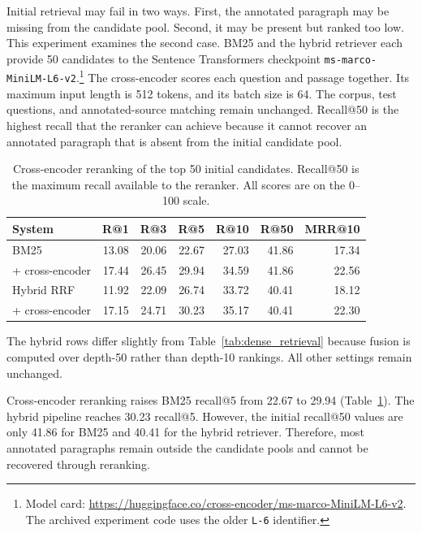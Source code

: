\documentclass[pdflatex,sn-basic]{sn-jnl}%
\theoremstyle{thmstyleone}%
\theoremstyle{thmstyletwo}%
\theoremstyle{thmstylethree}%
\begin{document}
Initial retrieval may fail in two ways. First, the annotated paragraph may be
missing from the candidate pool. Second, it may be present but ranked too low.
This experiment examines the second case. BM25 and the hybrid retriever each
provide 50 candidates to the Sentence Transformers checkpoint
\texttt{ms-marco-MiniLM-L6-v2}.\footnote{Model card:
\url{https://huggingface.co/cross-encoder/ms-marco-MiniLM-L6-v2}.
The archived experiment code uses the older \texttt{L-6} identifier.}
The cross-encoder scores each question and passage together. Its maximum input
length is 512 tokens, and its batch size is 64. The corpus, test questions,
and annotated-source matching remain unchanged. Recall@50 is the highest
recall that the reranker can achieve because it cannot recover an annotated
paragraph that is absent from the initial candidate pool.

\enlargethispage{27pt}%

\begin{table}[!htbp]
    \caption{Cross-encoder reranking of the top 50 initial candidates.
    Recall@50 is the maximum recall available to the reranker.
    All scores are on the 0--100 scale.}
    \label{tab:rerank}
    \centering
    \scriptsize
    \setlength{\tabcolsep}{3pt}
    \begin{tabular}{@{}lrrrrrr@{}}
        \toprule
        System & R@1 & R@3 & R@5 & R@10 & R@50 & MRR@10 \\
        \midrule
        BM25                   & 13.08 & 20.06 & 22.67 & 27.03 & 41.86 & 17.34 \\
        \quad + cross-encoder  & 17.44 & 26.45 & 29.94 & 34.59 & 41.86 & 22.56 \\
        Hybrid RRF             & 11.92 & 22.09 & 26.74 & 33.72 & 40.41 & 18.12 \\
        \quad + cross-encoder  & 17.15 & 24.71 & 30.23 & 35.17 & 40.41 & 22.30 \\
        \bottomrule
    \end{tabular}
    \begin{flushleft}
        {\scriptsize The hybrid rows differ slightly from
        Table~\ref{tab:dense_retrieval} because fusion is computed over
        depth-50 rather than depth-10 rankings. All other settings remain
        unchanged.}
    \end{flushleft}
\end{table}

Cross-encoder reranking raises BM25 recall@5 from 22.67 to 29.94
(Table~\ref{tab:rerank}). The hybrid pipeline reaches 30.23 recall@5.
However, the initial recall@50 values are only 41.86 for BM25 and 40.41 for
the hybrid retriever. Therefore, most annotated paragraphs remain outside
the candidate pools and cannot be recovered through reranking.
\end{document}
